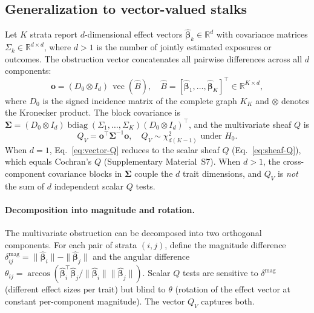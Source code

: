 \documentclass[11pt]{article}
\newcommand{\R}{\mathbb{R}}
\begin{document}
\subsection{Generalization to vector-valued stalks}
\label{sec:vector-math}

Let $K$ strata report $d$-dimensional effect vectors $\hat{\boldsymbol{\beta}}_k \in \R^d$ with covariance matrices $\Sigma_k \in \R^{d \times d}$, where $d > 1$ is the number of jointly estimated exposures or outcomes. The obstruction vector concatenates all pairwise differences across all $d$ components:
\begin{equation}
    \mathbf{o} = (D_0 \otimes I_d) \, \operatorname{vec}(\hat{B}), \quad
    \hat{B} = [\hat{\boldsymbol{\beta}}_1, \ldots, \hat{\boldsymbol{\beta}}_K]^\top \in \R^{K \times d},
    \label{eq:vector-obstruction}
\end{equation}
where $D_0$ is the signed incidence matrix of the complete graph $K_K$ and $\otimes$ denotes the Kronecker product. The block covariance is $\boldsymbol{\Sigma} = (D_0 \otimes I_d) \operatorname{bdiag}(\Sigma_1, \ldots, \Sigma_K) (D_0 \otimes I_d)^\top$, and the multivariate sheaf $Q$ is
\begin{equation}
    Q_V = \mathbf{o}^\top \boldsymbol{\Sigma}^{-1} \mathbf{o}, \quad
    Q_V \sim \chi^2_{d(K-1)} \text{ under } H_0.
    \label{eq:vector-Q}
\end{equation}
When $d = 1$, Eq.~\ref{eq:vector-Q} reduces to the scalar sheaf $Q$ (Eq.~\ref{eq:sheaf-Q}), which equals Cochran's $Q$ (Supplementary Material~S7). When $d > 1$, the cross-component covariance blocks in $\boldsymbol{\Sigma}$ couple the $d$ trait dimensions, and $Q_V$ is \emph{not} the sum of $d$ independent scalar $Q$ tests.

\paragraph{Decomposition into magnitude and rotation.}
The multivariate obstruction can be decomposed into two orthogonal components. For each pair of strata $(i, j)$, define the magnitude difference $\delta^{\mathrm{mag}}_{ij} = \|\hat{\boldsymbol{\beta}}_i\| - \|\hat{\boldsymbol{\beta}}_j\|$ and the angular difference $\theta_{ij} = \arccos(\hat{\boldsymbol{\beta}}_i^\top \hat{\boldsymbol{\beta}}_j / \|\hat{\boldsymbol{\beta}}_i\| \|\hat{\boldsymbol{\beta}}_j\|)$. Scalar $Q$ tests are sensitive to $\delta^{\mathrm{mag}}$ (different effect sizes per trait) but blind to $\theta$ (rotation of the effect vector at constant per-component magnitude). The vector $Q_V$ captures both.
\end{document}
